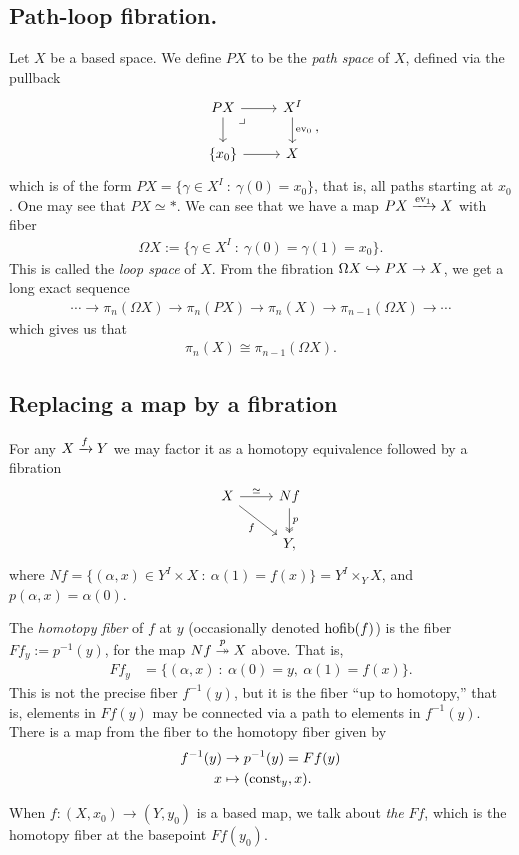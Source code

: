 \documentclass{article}[11pt]
\begin{document}
\subsection{Path-loop fibration.} Let $X$ be a based space. We define $PX$ to be the \textit{path space} of $X$, defined via the pullback
	\[
		\begin{tikzcd}
		PX\rar\dar\pb & X^I\dar["\ev_0" right] \\
		\{x_0\}\rar & X
		\end{tikzcd},
	\]
	which is of the form $PX = \{\gamma \in X^I \ : \ \gamma(0) = x_0\}$, that is, all paths starting at $x_0$. One may see that $PX \simeq \ast$. We can see that we have a map $PX \xrightarrow{\text{ev}_1} X$ with fiber
	\begin{align*}
		\Omega X:= \{\gamma \in X^I \ : \ \gamma(0)=\gamma(1)=x_0\}.
	\end{align*}
	This is called the \textit{loop space} of $X$. From the fibration $\Omega X \xhookrightarrow{} PX \to X$, we get a long exact sequence
	\begin{align*}
		\cdots \to \pi_n(\Omega X) \to \pi_n(PX) \to \pi_n(X) \to \pi_{n-1}(\Omega X) \to \cdots
	\end{align*}
	which gives us that
	\begin{align*}
		\pi_n(X) \cong \pi_{n-1}(\Omega X).
	\end{align*}


\subsection{Replacing a map by a fibration}
For any $X\xrightarrow{f} Y$ we may factor it as a homotopy equivalence followed by a fibration
\[
	\begin{tikzcd}
	X\rar["\simeq"]\ar[dr,"f" below left] & Nf\dar[two heads,"p" right] \\
	 & Y,
	\end{tikzcd}
\]
where $Nf = \{(\alpha,x)\in Y^I\times X \ : \ \alpha(1) = f(x)\} = Y^I \times_Y X$, and $p(\alpha,x) = \alpha(0)$.

\begin{definition} The \textit{homotopy fiber} of $f$ at $y$ (occasionally denoted $\text{hofib}(f)$) is the fiber $Ff_y := p^{-1}(y)$, for the map $Nf\overset{p}{\twoheadrightarrow} X$ above. That is,
\begin{align*}
	Ff_y &= \{(\alpha,x) \ : \ \alpha(0)=y,\ \alpha(1) = f(x) \}.
\end{align*}
This is not the precise fiber $f^{-1}(y)$, but it is the fiber ``up to homotopy,'' that is, elements in $Ff(y)$ may be connected via a path to elements in $f^{-1}(y)$. There is a map from the fiber to the homotopy fiber given by
\begin{align*}
	f^{-1}(y) &\to p^{-1}(y) = Ff(y) \\
	x &\mapsto (\text{const}_y, x).
\end{align*}

When $f: (X,x_0) \to (Y,y_0)$  is a based map, we talk about \emph{the} $Ff$, which is the homotopy fiber at the basepoint $Ff(y_0)$.


\end{definition}
\end{document}
